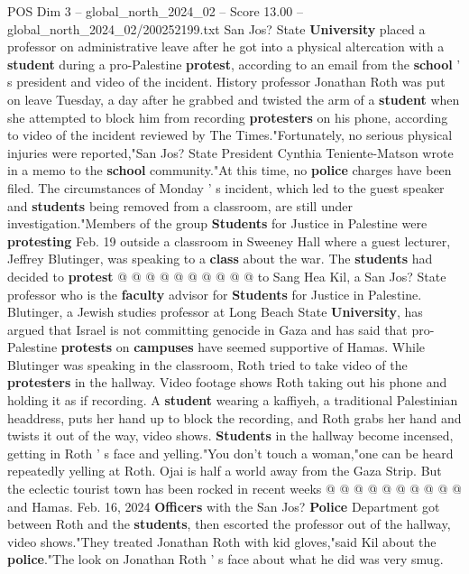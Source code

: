 \begin{textsample}{POS Dim 3 – global\_north\_2024\_02 – Score 13.00 – global\_north\_2024\_02/200252199.txt}  \label{ex:f3_pos_250}
San Jos?
State \textbf{University} placed a professor on administrative leave after he got into a physical altercation with a \textbf{student} during a pro-Palestine \textbf{protest}, according to an email from the \textbf{school} ' s president and video of the incident.
History professor Jonathan Roth was put on leave Tuesday, a day after he grabbed and twisted the arm of a \textbf{student} when she attempted to block him from recording \textbf{protesters} on his phone, according to video of the incident reviewed by The Times."Fortunately, no serious physical injuries were reported,"San Jos?
State President Cynthia Teniente-Matson wrote in a memo to the \textbf{school} community."At this time, no \textbf{police} charges have been filed.
The circumstances of Monday ' s incident, which led to the guest speaker and \textbf{students} being removed from a classroom, are still under investigation."Members of the group \textbf{Students} for Justice in Palestine were \textbf{protesting} Feb. 19 outside a classroom in Sweeney Hall where a guest lecturer, Jeffrey Blutinger, was speaking to a \textbf{class} about the war.
The \textbf{students} had decided to \textbf{protest} @ @ @ @ @ @ @ @ @ @ to Sang Hea Kil, a San Jos?
State professor who is the \textbf{faculty} advisor for \textbf{Students} for Justice in Palestine.
Blutinger, a Jewish studies professor at Long Beach State \textbf{University}, has argued that Israel is not committing genocide in Gaza and has said that pro-Palestine \textbf{protests} on \textbf{campuses} have seemed supportive of Hamas.
While Blutinger was speaking in the classroom, Roth tried to take video of the \textbf{protesters} in the hallway.
Video footage shows Roth taking out his phone and holding it as if recording.
A \textbf{student} wearing a kaffiyeh, a traditional Palestinian headdress, puts her hand up to block the recording, and Roth grabs her hand and twists it out of the way, video shows. \textbf{Students} in the hallway become incensed, getting in Roth ' s face and yelling."You don't touch a woman,"one can be heard repeatedly yelling at Roth.
Ojai is half a world away from the Gaza Strip.
But the eclectic tourist town has been rocked in recent weeks @ @ @ @ @ @ @ @ @ @ and Hamas.
Feb. 16, 2024 \textbf{Officers} with the San Jos? \textbf{Police} Department got between Roth and the \textbf{students}, then escorted the professor out of the hallway, video shows."They treated Jonathan Roth with kid gloves,"said Kil about the \textbf{police}."The look on Jonathan Roth ' s face about what he did was very smug.

\end{textsample}
